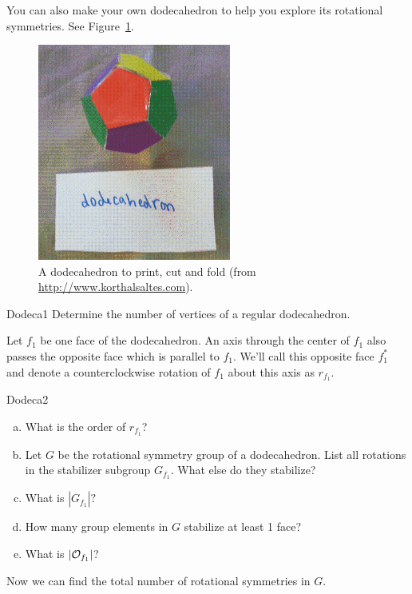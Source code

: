 You can also make your own dodecahedron to help you explore its rotational symmetries. See Figure~\ref{fig:DodecaFold}.

\begin{figure}[ht]
\begin{center}
\includegraphics[width=2.5in]{images/DodecahedronFold.png}
\caption{ \label{fig:DodecaFold}A dodecahedron to print, cut and fold  (from  \url{http://www.korthalsaltes.com}).}

\end{center}
\end{figure}

\begin{exercise}{Dodeca1}
Determine the number of vertices of a regular dodecahedron.
\end{exercise}
Let $f_1$ be one face of the dodecahedron.  An axis through the center of $f_1$ also passes the opposite face which is parallel to $f_1$. We'll call this opposite face $f_1^*$ and denote a counterclockwise rotation of $f_1$ about this axis as $r_{f_1}$.

\begin{exercise}{Dodeca2}
\begin{enumerate}[(a)]
\item What is the order of $r_{f_1}$?
\item Let $G$ be the rotational symmetry group of a dodecahedron.  List all rotations in the stabilizer subgroup $G_{f_1}$.  What else do they stabilize?
\item What is $|G_{f_1}|?$
\item How many group elements in $G$ stabilize at least 1 face?
\item What is $|{\cal O}_{f_1}|$?
\end{enumerate}
\end{exercise}
Now we can find the total number of rotational symmetries in $G$.

